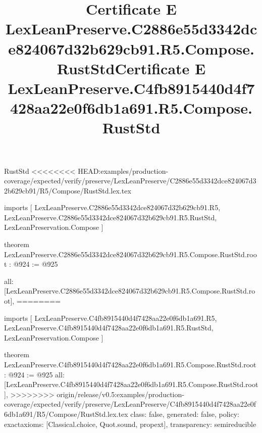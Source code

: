 \begin{lexlean}{RustStd}
<<<<<<<< HEAD:examples/production-coverage/expected/verify/preserve/LexLeanPreserve/C2886e55d3342dce824067d32b629cb91/R5/Compose/RustStd.lex.tex
\title{Certificate E LexLeanPreserve.C2886e55d3342dce824067d32b629cb91.R5.Compose.RustStd}
\begin{coremodule}
imports [
  LexLeanPreserve.C2886e55d3342dce824067d32b629cb91.R5,
  LexLeanPreserve.C2886e55d3342dce824067d32b629cb91.R5.RustStd,
  LexLeanPreservation.Compose
]

theorem LexLeanPreserve.C2886e55d3342dce824067d32b629cb91.R5.Compose.RustStd.root : @924 := @925 {
  all: [LexLeanPreserve.C2886e55d3342dce824067d32b629cb91.R5.Compose.RustStd.root],
========
\title{Certificate E LexLeanPreserve.C4fb8915440d4f7428aa22e0f6db1a691.R5.Compose.RustStd}
\begin{coremodule}
imports [
  LexLeanPreserve.C4fb8915440d4f7428aa22e0f6db1a691.R5,
  LexLeanPreserve.C4fb8915440d4f7428aa22e0f6db1a691.R5.RustStd,
  LexLeanPreservation.Compose
]

theorem LexLeanPreserve.C4fb8915440d4f7428aa22e0f6db1a691.R5.Compose.RustStd.root : @924 := @925 {
  all: [LexLeanPreserve.C4fb8915440d4f7428aa22e0f6db1a691.R5.Compose.RustStd.root],
>>>>>>>> origin/release/v0.5:examples/production-coverage/expected/verify/preserve/LexLeanPreserve/C4fb8915440d4f7428aa22e0f6db1a691/R5/Compose/RustStd.lex.tex
  class: false,
  generated: false,
  policy: exact{axioms: [Classical.choice, Quot.sound, propext]},
  transparency: semireducible
}


\end{coremodule}}
\end{coremodule}
\end{lexlean}
